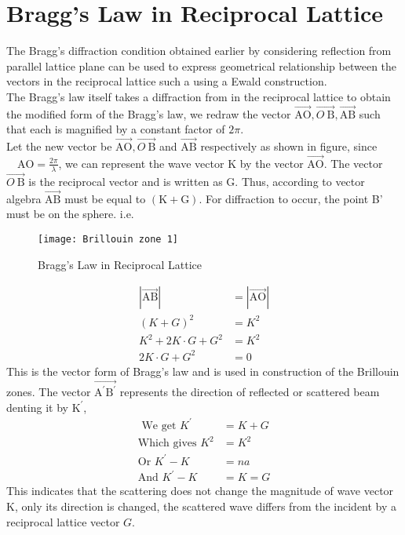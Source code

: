 \section{Bragg's Law in Reciprocal Lattice}
The Bragg's diffraction condition obtained earlier by considering reflection from parallel lattice plane can be used to express geometrical relationship between the vectors in the reciprocal lattice such a using a Ewald construction.\\
The Bragg's law itself takes a diffraction from in the reciprocal lattice to obtain the modified form of the Bragg's law, we redraw the vector $\overrightarrow{\mathrm{AO}}, \overrightarrow{O \mathrm{~B}}, \overrightarrow{\mathrm{AB}}$ such that each is magnified by a constant factor of $2 \pi$. \\
Let the new vector be $\overrightarrow{\mathrm{AO}}, \overrightarrow{O \mathrm{~B}}$ and $\overrightarrow{\mathrm{AB}}$ respectively as shown in figure, since $\quad \mathrm{AO}=\frac{2 \pi}{\lambda}$, we can represent the wave vector $\mathrm{K}$ by the vector $\overrightarrow{\mathrm{AO}}$. The vector $\overrightarrow{O \mathrm{~B}}$ is the reciprocal vector and is written as $\mathrm{G}$. Thus, according to vector algebra $\overrightarrow{\mathrm{AB}}$ must be equal to $(\mathrm{K}+\mathrm{G})$. For diffraction to occur, the point B' must be on the sphere. i.e.
\begin{figure}[H]
	\centering
	\texttt{[image: Brillouin zone 1]}
	\caption{Bragg's Law in Reciprocal Lattice}
	\label{Bragg's Law in Reciprocal Lattice}
\end{figure}

\begin{align*}
|\overrightarrow{\mathrm{AB}}|&=|\overrightarrow{\mathrm{AO}}| \\
(K+G)^{2}&=K^{2} \\
K^{2}+2 K \cdot G+G^{2}&=K^{2} \\
2 K \cdot G+G^{2}&=0
\end{align*}
This is the vector form of Bragg's law and is used in construction of the Brillouin zones.
The vector $\overrightarrow{\mathrm{A}^{\prime} \mathrm{B}^{\prime}}$ represents the direction of reflected or scattered beam denting it by $\mathrm{K}^{\prime}$,
\begin{align*}
\text{ We get }K^{\prime}&=K+G\\
\text{Which gives } K^{2}&=K^{2}\\ 
\text{Or } K^{\prime}-K&=n a\\
\text{And }K^{\prime}-K&=K=G
\end{align*}
This indicates that the scattering does not change the magnitude of wave vector $\mathrm{K}$, only its direction is changed, the scattered wave differs from the incident by a reciprocal lattice vector $G$. 
